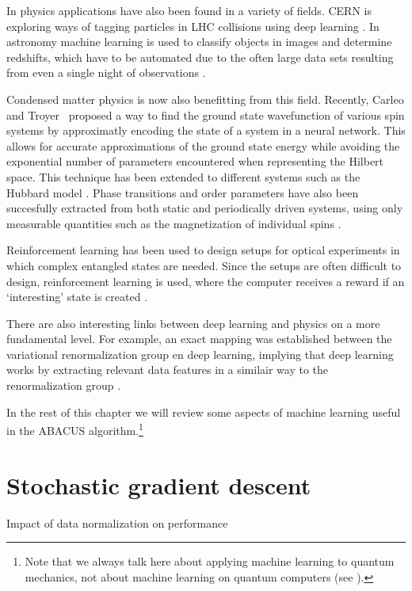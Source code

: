 \documentclass[11pt, a4paper]{report} %
\begin{document}
In physics applications have also been found in a variety of fields.
CERN is exploring ways of tagging particles in LHC collisions using deep learning \cite{paganini17_machin_learn_algor_jet_taggin}.
In astronomy machine learning is used to classify objects in images and determine redshifts, which have to be automated due to the often large data sets resulting from even a single night of observations \cite{ball10_data_minin_and_machin_learn_in_astron}.

Condensed matter physics is now also benefitting from this field.
Recently, Carleo and Troyer~\cite{Carleo2017} proposed a way to find the ground state wavefunction of various spin systems by approximatly encoding the state of a system in a neural network. This allows for accurate approximations of the ground state energy while avoiding the exponential number of parameters encountered when representing the Hilbert space.
This technique has been extended to different systems such as the Hubbard model \cite{Saito2017}.
Phase transitions and order parameters have also been succesfully extracted from both static and periodically driven systems, using only measurable quantities such as the magnetization of individual spins \cite{Nieuwenburg2017}.

Reinforcement learning has been used to design setups for optical experiments in which complex entangled states are needed.
Since the setups are often difficult to design, reinforcement learning is used, where the computer receives a reward if an `interesting' state is created \cite{dunjko17_machin_learn_artif_intel_quant_domain}.

There are also interesting links between deep learning and physics on a more fundamental level.
For example, an exact mapping was established between the variational renormalization group en deep learning, implying that deep learning works by extracting relevant data features in a similair way to the renormalization group \cite{Mehta2014}. 

In the rest of this chapter we will review some aspects of machine learning useful in the ABACUS algorithm.\footnote{Note that we always talk here about applying machine learning to quantum mechanics, not about machine learning on quantum computers (see \cite{Dunjko2017}).}

\section{Stochastic gradient descent}
Impact of data normalization on performance
\end{document}
